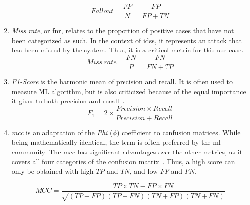 \begin{enumerate}[(1)]
  \begin{equation*}
    Fallout = \frac{FP}{N} = \frac{FP}{FP+TN}
  \end{equation*}

  \item \emph{Miss rate}, or \gls{fnr}, relates to the proportion of positive cases that have not been categorized as such.
  In the context of \glspl{ids}, it represents an attack that has been missed by the system.
  Thus, it is a critical metric for this use case.
  \begin{equation*}
    Miss\ rate = \frac{FN}{P} = \frac{FN}{FN+TP}
  \end{equation*}

  \item \emph{F1-Score} is the harmonic mean of precision and recall.
  It is often used to measure ML algorithm, but is also criticized because of the equal importance it gives to both precision and recall~\cite{hand_noteusingFmeasure_2018}.
  \begin{equation*}
    F_1 = 2 \times \frac{Precision \times Recall}{Precision+Recall}
  \end{equation*}

  \item \emph{\gls{mcc}} is an adaptation of the \emph{Phi} (\(\phi\)) coefficient to confusion matrices.
  While being mathematically identical, the term is often preferred by the \gls{ml} community.
  The \gls{mcc} has significant advantages over the other metrics, as it covers all four categories of the confusion matrix~\cite{chicco_advantagesMatthewscorrelation_2020}.
  Thus, a high score can only be obtained with high \(TP\) and \(TN\), and low \(FP\) and \(FN\).

  \begin{equation*}
      MCC = \dfrac{TP \times TN - FP \times FN}{\sqrt{(TP + FP)(TP + FN)(TN + FP)(TN + FN)}}
  \end{equation*}%

\end{enumerate}